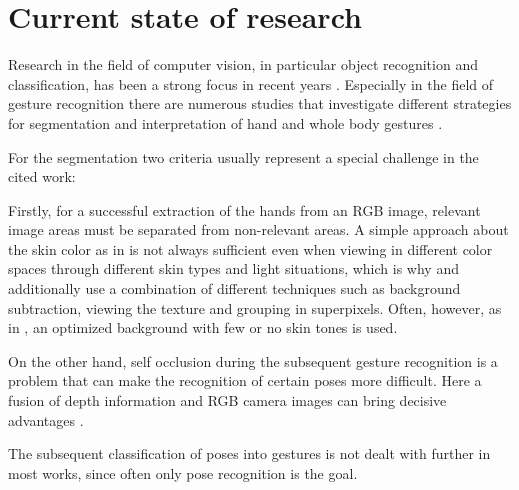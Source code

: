 \section{Current state of research}
Research in the field of computer vision, in particular object recognition and classification, has been a strong focus in recent years \cite{FeiFei}. Especially in the field of gesture recognition there are numerous studies that investigate different strategies for segmentation and interpretation of hand and whole body gestures \cite{Zimmermann2017,Sato2001,Supancic2018,Tompson2014,Zhang2016,OhnBar2014,Ge2019,Keskin2012,Li2013,Jones2002}. 


For the segmentation two criteria usually represent a special challenge in the cited work:

Firstly, for a successful extraction of the hands from an RGB image, relevant image areas must be separated from non-relevant areas. A simple approach about the skin color as in \cite{Sato2001} is not always sufficient even when viewing in different color spaces through different skin types and light situations, which is why \cite{Zhang2016} and \cite{Li2013} additionally use a combination of different techniques such as background subtraction, viewing the texture and grouping in superpixels. Often, however, as in \cite{Sridhar2013}, an optimized background with few or no skin tones is used.

On the other hand, self occlusion during the subsequent gesture recognition is a problem that can make the recognition of certain poses more difficult. Here a fusion of depth information and RGB camera images can bring decisive advantages \cite{Keskin2012}.

The subsequent classification of poses into gestures is not dealt with further in most works, since often only pose recognition is the goal.